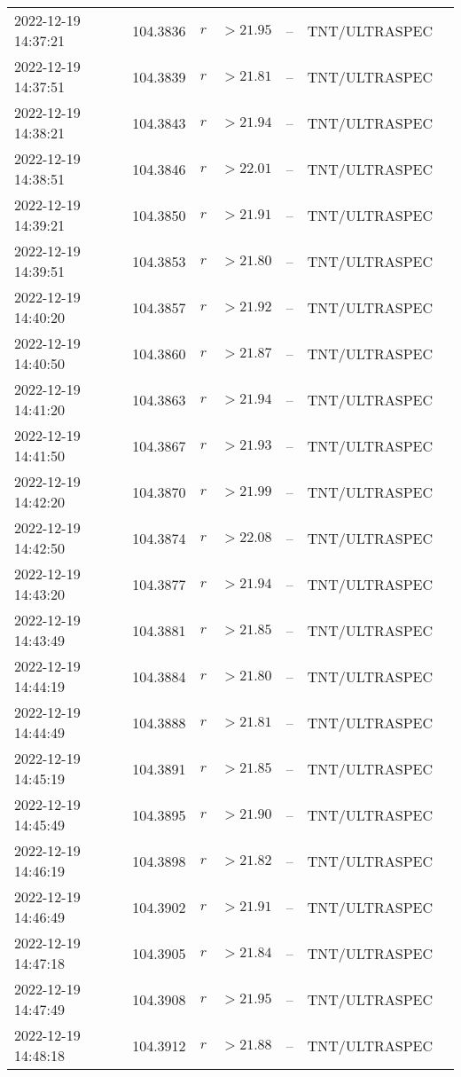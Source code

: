 \documentclass{nature_plusfigure}
\begin{document}
\begin{supplement}
\begin{center}
\begin{longtable}{lllllll}
2022-12-19 14:37:21 & 104.3836 & $r$ & $>21.95$ & -- & TNT/ULTRASPEC &  \\ 
2022-12-19 14:37:51 & 104.3839 & $r$ & $>21.81$ & -- & TNT/ULTRASPEC &  \\ 
2022-12-19 14:38:21 & 104.3843 & $r$ & $>21.94$ & -- & TNT/ULTRASPEC &  \\ 
2022-12-19 14:38:51 & 104.3846 & $r$ & $>22.01$ & -- & TNT/ULTRASPEC &  \\ 
2022-12-19 14:39:21 & 104.3850 & $r$ & $>21.91$ & -- & TNT/ULTRASPEC &  \\ 
2022-12-19 14:39:51 & 104.3853 & $r$ & $>21.80$ & -- & TNT/ULTRASPEC &  \\ 
2022-12-19 14:40:20 & 104.3857 & $r$ & $>21.92$ & -- & TNT/ULTRASPEC &  \\ 
2022-12-19 14:40:50 & 104.3860 & $r$ & $>21.87$ & -- & TNT/ULTRASPEC &  \\ 
2022-12-19 14:41:20 & 104.3863 & $r$ & $>21.94$ & -- & TNT/ULTRASPEC &  \\ 
2022-12-19 14:41:50 & 104.3867 & $r$ & $>21.93$ & -- & TNT/ULTRASPEC &  \\ 
2022-12-19 14:42:20 & 104.3870 & $r$ & $>21.99$ & -- & TNT/ULTRASPEC &  \\ 
2022-12-19 14:42:50 & 104.3874 & $r$ & $>22.08$ & -- & TNT/ULTRASPEC &  \\ 
2022-12-19 14:43:20 & 104.3877 & $r$ & $>21.94$ & -- & TNT/ULTRASPEC &  \\ 
2022-12-19 14:43:49 & 104.3881 & $r$ & $>21.85$ & -- & TNT/ULTRASPEC &  \\ 
2022-12-19 14:44:19 & 104.3884 & $r$ & $>21.80$ & -- & TNT/ULTRASPEC &  \\ 
2022-12-19 14:44:49 & 104.3888 & $r$ & $>21.81$ & -- & TNT/ULTRASPEC &  \\ 
2022-12-19 14:45:19 & 104.3891 & $r$ & $>21.85$ & -- & TNT/ULTRASPEC &  \\ 
2022-12-19 14:45:49 & 104.3895 & $r$ & $>21.90$ & -- & TNT/ULTRASPEC &  \\ 
2022-12-19 14:46:19 & 104.3898 & $r$ & $>21.82$ & -- & TNT/ULTRASPEC &  \\ 
2022-12-19 14:46:49 & 104.3902 & $r$ & $>21.91$ & -- & TNT/ULTRASPEC &  \\ 
2022-12-19 14:47:18 & 104.3905 & $r$ & $>21.84$ & -- & TNT/ULTRASPEC &  \\ 
2022-12-19 14:47:49 & 104.3908 & $r$ & $>21.95$ & -- & TNT/ULTRASPEC &  \\ 
2022-12-19 14:48:18 & 104.3912 & $r$ & $>21.88$ & -- & TNT/ULTRASPEC &  \\ 

\end{longtable}
\end{center}
\end{supplement}
\end{document}
